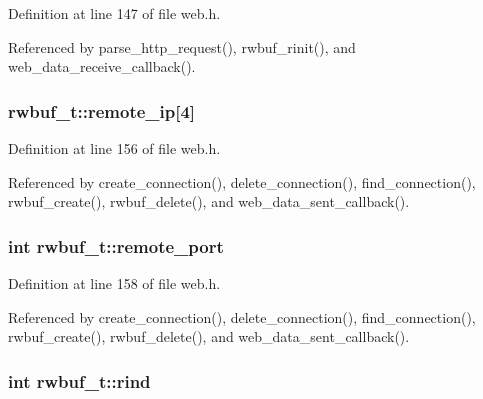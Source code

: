 Definition at line 147 of file web.\+h.



Referenced by parse\+\_\+http\+\_\+request(), rwbuf\+\_\+rinit(), and web\+\_\+data\+\_\+receive\+\_\+callback().

\subsubsection[{\texorpdfstring{remote\+\_\+ip}{remote_ip}}]{ rwbuf\+\_\+t\+::remote\+\_\+ip\mbox{[}4\mbox{]}}\hypertarget{structrwbuf__t_ad83926198e358ac1a569b0da7749572c}{}\label{structrwbuf__t_ad83926198e358ac1a569b0da7749572c}


Definition at line 156 of file web.\+h.



Referenced by create\+\_\+connection(), delete\+\_\+connection(), find\+\_\+connection(), rwbuf\+\_\+create(), rwbuf\+\_\+delete(), and web\+\_\+data\+\_\+sent\+\_\+callback().

\subsubsection[{\texorpdfstring{remote\+\_\+port}{remote_port}}]{\setlength{\rightskip}{0pt plus 5cm}int rwbuf\+\_\+t\+::remote\+\_\+port}\hypertarget{structrwbuf__t_aace1e79a985cc8fab4c2093208bf3763}{}\label{structrwbuf__t_aace1e79a985cc8fab4c2093208bf3763}


Definition at line 158 of file web.\+h.



Referenced by create\+\_\+connection(), delete\+\_\+connection(), find\+\_\+connection(), rwbuf\+\_\+create(), rwbuf\+\_\+delete(), and web\+\_\+data\+\_\+sent\+\_\+callback().

\subsubsection[{\texorpdfstring{rind}{rind}}]{\setlength{\rightskip}{0pt plus 5cm}int rwbuf\+\_\+t\+::rind}\hypertarget{structrwbuf__t_ad5cbf7a78a5f5d9aa75b38f90e0fb6af}{}\label{structrwbuf__t_ad5cbf7a78a5f5d9aa75b38f90e0fb6af}


